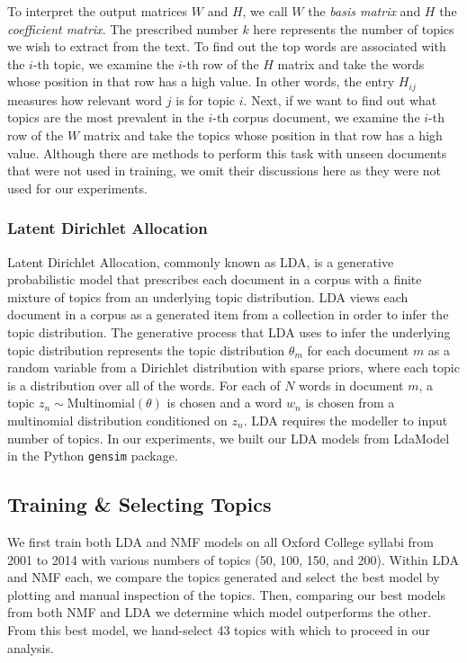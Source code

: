 \documentclass[fleqn,10pt]{JLA_article} %
\begin{document}
To interpret the output matrices $W$ and $H$, we call $W$ the \textit{basis matrix} and $H$ the \textit{coefficient matrix}. The prescribed number $k$ here represents the number of topics we wish to extract from the text. To find out the top words are associated with the $i$-th topic, we examine the $i$-th row of the $H$ matrix and take the words whose position in that row has a high value. In other words, the entry $H_{ij}$ measures how relevant word $j$ is for topic $i$. Next, if we want to find out what topics are the most prevalent in the $i$-th corpus document, we examine the $i$-th row of the $W$ matrix and take the topics whose position in that row has a high value. Although there are methods to perform this task with unseen documents that were not used in training, we omit their discussions here as they were not used for our experiments.

\subsubsection{Latent Dirichlet Allocation}

Latent Dirichlet Allocation, commonly known as LDA, is a generative probabilistic model that prescribes each document in a corpus with a finite mixture of topics from an underlying topic distribution. LDA views each document in a corpus as a generated item from a collection in order to infer the topic distribution. The generative process that LDA uses to infer the underlying topic distribution represents the topic distribution $\theta_m$ for each document $m$ as a random variable from a Dirichlet distribution with sparse priors, where each topic is a distribution over all of the words. For each of $N$ words in document $m$, a topic $z_n \sim \text{Multinomial}(\theta)$ is chosen and a word $w_n$ is chosen from a multinomial distribution conditioned on $z_n$. LDA requires the modeller to input number of topics. In our experiments, we built our LDA models from LdaModel in the Python \texttt{gensim} package. 



\subsection{Training \& Selecting Topics}

We first train both LDA and NMF models on all Oxford College syllabi from 2001 to 2014 with various numbers of topics (50, 100, 150, and 200). Within LDA and NMF each, we compare the topics generated and select the best model by plotting and manual inspection of the topics. Then, comparing our best models from both NMF and LDA we determine which model outperforms the other. From this best model, we hand-select 43 topics with which to proceed in our analysis.
\end{document}
